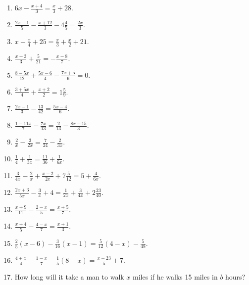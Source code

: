 \documentclass{book}
\begin{document}
\begin{enumerate}
\item $\displaystyle 6x - \frac{x + 4}{3} = \frac{x}{3} + 28$.

\item $\displaystyle \frac{2x - 1}{5} - \frac{x + 12}{3} -
4\frac{4}{5} = \frac{2x}{3}$.

\item $\displaystyle x - \frac{x}{4} + 25 = \frac{x}{3} +
\frac{x}{2} + 21$.

\item $\displaystyle \frac{x - 3}{3} + \frac{5}{21} = -\frac{x -
8}{7}$.

\item $\displaystyle \frac{8 - 5x}{12} + \frac{5x - 6}{4} -
\frac{7x + 5}{6} = 0$.

\item $\displaystyle \frac{3 + 5x}{4} + \frac{x + 2}{2} =
1\frac{5}{9}$.

\item $\displaystyle \frac{2x - 1}{3} - \frac{13}{42} = \frac{5x -
4}{6}$.

\item $\displaystyle \frac{1 - 11x}{7} - \frac{7x}{13} =
\frac{2}{13} - \frac{8x - 15}{3}$.

\item $\displaystyle \frac{2}{x}-\frac{3}{2x} =
\frac{7}{24}-\frac{2}{3x}$.

\item $\displaystyle \frac{1}{4}+\frac{1}{3x} =
\frac{11}{36}+\frac{1}{6x}$.

\item $\displaystyle
\frac{3}{4x}-\frac{2}{x}+\frac{x-2}{2x}+7\frac{5}{12} =
5+\frac{4}{6x}$.

\item $\displaystyle \frac{2x+3}{5x}-\frac{3}{x}+4 =
\frac{1}{2x}+\frac{3}{4x}+2\frac{23}{40}$.

\item $\displaystyle \frac{x+9}{11}-\frac{2-x}{5} =
\frac{x+5}{7}$.

\item $\displaystyle \frac{x+4}{5}-\frac{4-x}{7} = \frac{x+1}{3}$.

\item $\displaystyle \frac{2}{5}(x-6)-\frac{3}{16}(x-1) =
\frac{5}{12}(4-x)-\frac{5}{48}$.

\item $\displaystyle \frac{4+x}{4}-\frac{1-x}{7}-\frac{1}{5}(8-x)
= \frac{x-23}{5}+7$.

\item How long will it take a man to walk $x$ miles if he walks 15
miles in $b$ hours?


\end{enumerate}
\end{document}
